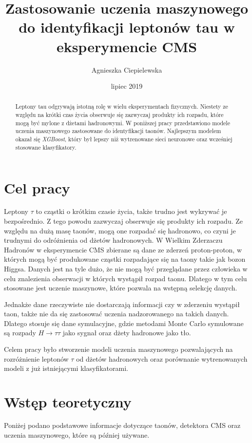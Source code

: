 \documentclass{pracalicmgr}
\author{Agnieszka Ciepielewska}
\title{Zastosowanie uczenia maszynowego do identyfikacji leptonów tau w eksperymencie CMS}
\date{lipiec 2019}
\begin{document}
    \maketitle
    \let\cleardoublepage\clearpage
    
    \begin{abstract}
    Leptony tau	odgrywają istotną rolę w wielu eksperymentach fizycznych. Niestety ze względu na krótki czas życia obserwuje się zazwyczaj produkty ich rozpadu, które mogą być mylone z dżetami hadronowymi. W poniższej pracy przedstawiono modele uczenia maszynowego zastosowane do identyfikacji taonów. Najlepszym modelem okazał się \textit{XGBoost}, który był lepszy niż wytrenowane sieci neuronowe oraz wcześniej stosowane klasyfikatory.

    \end{abstract}

    \tableofcontents
    
    \chapter*{Cel pracy}
    Leptony $\tau$ to cząstki o krótkim czasie życia, także trudno jest wykrywać je bezpośrednio. Z tego powodu zazwyczaj obserwuje się produkty ich rozpadu. Ze względu na dużą masę taonów, mogą one rozpadać się hadronowo, co czyni je trudnymi do odróżnienia od dżetów hadronowych. W Wielkim Zderzaczu Hadronów w eksperymencie CMS zbierane są dane ze zderzeń proton-proton, w których mogą być produkowane cząstki rozpadające się na taony takie jak bozon Higgsa. Danych jest na tyle dużo, że nie mogą być przeglądane przez człowieka w celu znalezienia obserwacji w których wystąpił rozpad taonu. Dlatego w tym celu stosowane jest uczenie maszynowe, które pozwala na wstępną selekcję danych.
    
    Jednakże dane rzeczywiste nie dostarczają informacji czy w zderzeniu wystąpił taon, także nie da się zastosować uczenia nadzorowanego na takich danych. Dlatego stosuje się dane symulacyjne, gdzie metodami Monte Carlo symulowane są rozpady $H \rightarrow \tau\tau$ jako sygnał oraz dżety hadronowe jako tło.
    
    Celem pracy było stworzenie modeli uczenia maszynowego pozwalających na rozróżnienie leptonów $\tau$ od dżetów hadronowych oraz porównanie wytrenowanych modeli z już istniejącymi klasyfikatorami.
    
    \chapter{Wstęp teoretyczny}
    \label{ch:wstep}
	Poniżej podano podstawowe informacje dotyczące taonów, detektora CMS oraz uczenia maszynowego, które są później używane.
\end{document}
